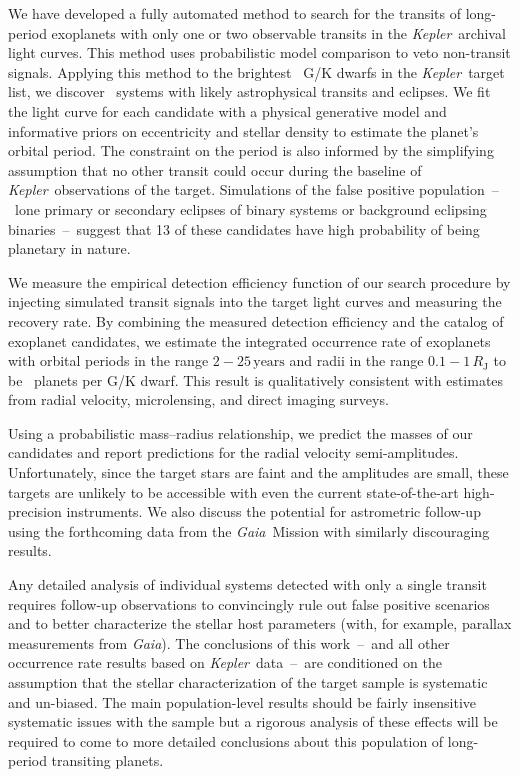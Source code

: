 \documentclass[manuscript, letterpaper]{aastex6}
\newcommand{\project}[1]{\textsl{#1}}
\newcommand{\kepler}{\project{Kepler}}
\newcommand{\gaia}{\project{Gaia}}
\newcommand{\unit}[1]{{\ensuremath{\,\mathrm{#1}}}}
\begin{document}
We have developed a fully automated method to search for the transits of
long-period exoplanets with only one or two observable transits in the
\kepler\ archival light curves.
This method uses probabilistic model comparison to veto non-transit signals.
Applying this method to the brightest \numtargets\ G/K dwarfs in the \kepler\
target list, we discover \numcands\ systems with likely astrophysical
transits and eclipses.
We fit the light curve for each candidate with a physical generative model and
informative priors on eccentricity and stellar density to estimate the
planet's orbital period.
The constraint on the period is also informed by the simplifying assumption
that no other transit could occur during the baseline of \kepler\ observations
of the target.
Simulations of the false positive population~--~lone primary or secondary
eclipses of binary systems or background eclipsing binaries~--~suggest that 13
of these candidates have high probability of being planetary in nature.

We measure the empirical detection efficiency function of our search procedure
by injecting simulated transit signals into the target light curves and
measuring the recovery rate.
By combining the measured detection efficiency and the catalog of exoplanet
candidates, we estimate the integrated occurrence rate of exoplanets with
orbital periods in the range $2-25\unit{years}$ and radii in the range
$0.1-1\,R_\mathrm{J}$ to be \intocc\ planets per G/K dwarf.
This result is qualitatively consistent with estimates from radial velocity,
microlensing, and direct imaging surveys.

Using a probabilistic mass--radius relationship, we predict the masses of our
candidates and report predictions for the radial velocity semi-amplitudes.
Unfortunately, since the target stars are faint and the amplitudes are small,
these targets are unlikely to be accessible with even the current
state-of-the-art high-precision instruments.
We also discuss the potential for astrometric follow-up using the forthcoming
data from the \gaia\ Mission with similarly discouraging results.

Any detailed analysis of individual systems detected with only a single
transit requires follow-up observations to convincingly rule out false
positive scenarios and to better characterize the stellar host parameters
(with, for example, parallax measurements from \gaia).
The conclusions of this work~--~and all other occurrence rate results based on
\kepler\ data~--~are conditioned on the assumption that the stellar
characterization of the target sample is systematic and un-biased.
The main population-level results should be fairly insensitive systematic
issues with the sample but a rigorous analysis of these effects will be
required to come to more detailed conclusions about this population of
long-period transiting planets.
\end{document}
